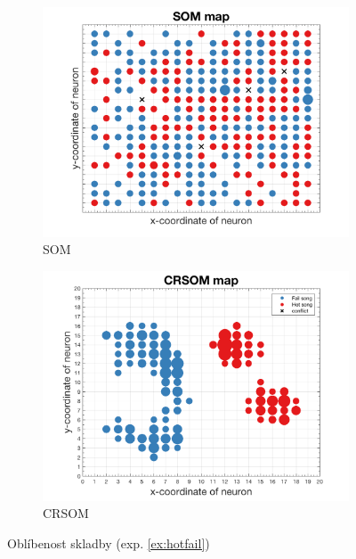 \documentclass[thesis=M,czech]{FITthesis}[2012/06/26]
\begin{document}
\begin{figure}
\centering
\begin{subfigure}{.5\textwidth}
  \centering
  \includegraphics[width=.99\linewidth]{exp_trend_fail2_som.png}
  \caption{SOM}
  \label{fig:sub1}
\end{subfigure}%
\begin{subfigure}{.5\textwidth}
  \centering
  \includegraphics[width=.99\linewidth]{exp_trend_fail2_crsom.png}
  \caption{CRSOM}
  \label{fig:sub2}
\end{subfigure}
\caption{Oblíbenost skladby (exp. \ref{ex:hotfail})}
\label{fig:hotfail}
\end{figure}
\end{document}
